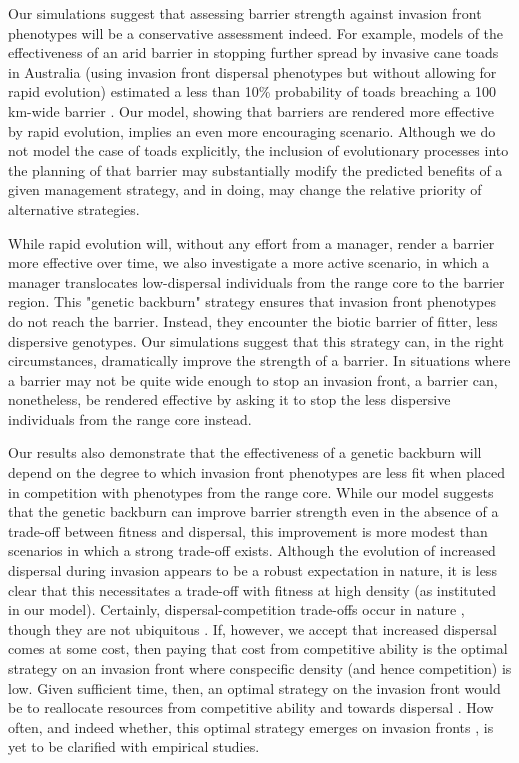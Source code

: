 \documentclass{article}
\begin{document}
Our simulations suggest that assessing barrier strength against invasion front phenotypes will be a conservative assessment indeed.  For example, models of the effectiveness of an arid barrier in stopping further spread by invasive cane toads in Australia (using invasion front dispersal phenotypes but without allowing for rapid evolution) estimated a less than 10\% probability of toads breaching a 100 km-wide barrier \citep[Fig. 6 in][]{Tingley_Phillips_Letnic_Brown_Shine_Baird_2013}. Our model, showing that barriers are rendered more effective by rapid evolution, implies an even more encouraging scenario. Although we do not model the case of toads explicitly, the inclusion of evolutionary processes into the planning of that barrier may substantially modify the predicted benefits of a given management strategy, and in doing, may change the relative priority of alternative strategies. 

While rapid evolution will, without any effort from a manager, render a barrier more effective over time, we also investigate a more active scenario, in which a manager translocates low-dispersal individuals from the range core to the barrier region.  This "genetic backburn" strategy ensures that invasion front phenotypes do not reach the barrier.  Instead, they encounter the biotic barrier of fitter, less dispersive genotypes.  Our simulations suggest that this strategy can, in the right circumstances, dramatically improve the strength of a barrier.  In situations where a barrier may not be quite wide enough to stop an invasion front, a barrier can, nonetheless, be rendered effective by asking it to stop the less dispersive individuals from the range core instead.    

Our results also demonstrate that the effectiveness of a genetic backburn will depend on the degree to which invasion front phenotypes are less fit when placed in competition with phenotypes from the range core.  While our model suggests that the genetic backburn can improve barrier strength even in the absence of a trade-off between fitness and dispersal, this improvement is more modest than scenarios in which a strong trade-off exists.  Although the evolution of increased dispersal during invasion appears to be a robust expectation in nature, it is less clear that this necessitates a trade-off with fitness at high density (as instituted in our model).  Certainly, dispersal-competition trade-offs occur in nature \citep[e.g.,][]{Jakobsson_2003, Cadotte_2006}, though they are not ubiquitous \citep[e.g.,][]{Limberger_2011}.  If, however, we accept that increased dispersal comes at some cost, then paying that cost from competitive ability is the optimal strategy on an invasion front where conspecific density (and hence competition) is low.  Given sufficient time, then, an optimal strategy on the invasion front would be to reallocate resources from competitive ability and towards dispersal \citep{Burton_Travis_Phillips_2010}.  How often, and indeed whether, this optimal strategy emerges on invasion fronts \citep[where stochastic forces often lead to non-optimal phenotypes dominating:][]{Peischl_2015, Peischl_Dupanloup_Kirkpatrick_Excoffier_2013, Phillips_2015}, is yet to be clarified with empirical studies.
\end{document}
